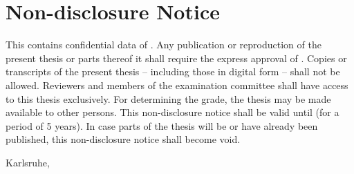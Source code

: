\thispagestyle{empty}

\chapter*{Non-disclosure Notice}

This \artderarbeit contains confidential data of \sperrvermerkUnternehmen. Any publication or reproduction of the present thesis or parts thereof it shall require the express approval of \sperrvermerkUnternehmen. Copies or transcripts of the present thesis -- including those in digital form -- shall not be allowed. Reviewers and members of the examination committee shall have access to this thesis exclusively. For determining the grade, the thesis may be made available to other persons. This non-disclosure notice shall be valid until \sperrvermerkDatum{} (for a period of 5 years). In case parts of the thesis will be or have already been published, this non-disclosure notice shall become void.

\vspace{0.5cm}

Karlsruhe, \abgabe